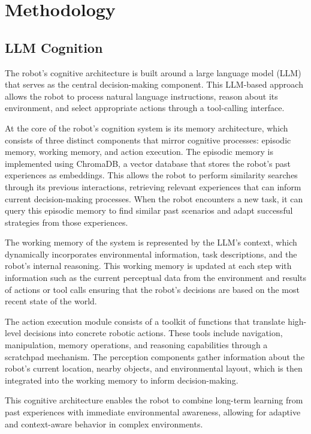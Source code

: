 \documentclass[../report.tex]{subfiles}
\begin{document}
\section{Methodology}
\label{sec:methodology}

\subsection{LLM Cognition}
The robot's cognitive architecture is built around a large language model (LLM) that serves as the central decision-making component. This LLM-based approach allows the robot to process natural language instructions, reason about its environment, and select appropriate actions through a tool-calling interface.

At the core of the robot's cognition system is its memory architecture, which consists of three distinct components that mirror cognitive processes: episodic memory, working memory, and action execution. The episodic memory is implemented using ChromaDB, a vector database that stores the robot's past experiences as embeddings. This allows the robot to perform similarity searches through its previous interactions, retrieving relevant experiences that can inform current decision-making processes. When the robot encounters a new task, it can query this episodic memory to find similar past scenarios and adapt successful strategies from those experiences.

The working memory of the system is represented by the LLM's context, which dynamically incorporates environmental information, task descriptions, and the robot's internal reasoning. This working memory is updated at each step with information such as the current perceptual data from the environment and results of actions or tool calls ensuring that the robot's decisions are based on the most recent state of the world.

The action execution module consists of a toolkit of functions that translate high-level decisions into concrete robotic actions. These tools include navigation, manipulation, memory operations, and reasoning capabilities through a scratchpad mechanism. The perception components gather information about the robot's current location, nearby objects, and environmental layout, which is then integrated into the working memory to inform decision-making.

This cognitive architecture enables the robot to combine long-term learning from past experiences with immediate environmental awareness, allowing for adaptive and context-aware behavior in complex environments.
\end{document}
